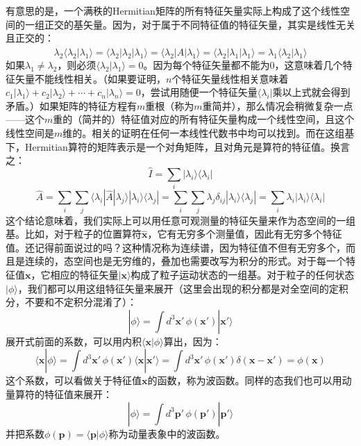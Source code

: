 \documentclass{ctexart}
\begin{document}
有意思的是，一个满秩的Hermitian矩阵的所有特征矢量实际上构成了这个线性空间的一组正交的基矢量。因为，对于属于不同特征值的特征矢量，其实是线性无关且正交的：
\begin{equation}
\lambda_2\langle\lambda_2|\lambda_1\rangle=\langle\lambda_2|\lambda_2|\lambda_1\rangle=\langle\lambda_2|\hat{A}|\lambda_1\rangle=\langle\lambda_2|\lambda_1|\lambda_1\rangle=\lambda_1\langle\lambda_2|\lambda_1\rangle
\end{equation}
如果$\lambda_1\neq\lambda_2$，则必须$\langle\lambda_2|\lambda_1\rangle=0$。因为每个特征矢量都不能为0，这意味着几个特征矢量不能线性相关。（如果要证明，$n$个特征矢量线性相关意味着$c_1|\lambda_1\rangle+c_2|\lambda_2\rangle+\cdots+c_n|\lambda_n\rangle=0$，尝试用随便一个特征矢量$\langle\lambda_i|$乘以上式就会得到矛盾。）如果矩阵的特征方程有$m$重根（称为$m$重简并），那么情况会稍微复杂一点——这个$m$重的（简并的）特征值对应的所有特征矢量构成一个线性空间，且这个线性空间是$m$维的。相关的证明在任何一本线性代数书中均可以找到。而在这组基下，Hermitian算符的矩阵表示是一个对角矩阵，且对角元是算符的特征值。换言之：
\begin{equation}
\hat{I}=\sum_i|\lambda_i\rangle\langle\lambda_i|
\end{equation}
\begin{equation}
\hat{A}=\sum_i\sum_j\langle \lambda_i|\hat{A}|\lambda_j\rangle|\lambda_i\rangle\langle \lambda_j|=\sum_i\sum_j\lambda_j\delta_{ij}|\lambda_i\rangle\langle \lambda_j|=\sum_i\lambda_i|\lambda_i\rangle\langle \lambda_i|
\end{equation}
这个结论意味着，我们实际上可以用任意可观测量的特征矢量来作为态空间的一组基。比如，对于粒子的位置算符$\hat{\bm{x}}$，它有无穷多个测量值，因此有无穷多个特征值。还记得前面说过的吗？这种情况称为连续谱，因为特征值不但有无穷多个，而且是连续的，态空间也是无穷维的，叠加也需要改写为积分的形式。对于每一个特征值$\bm{x}$，它相应的特征矢量$|\bm{x}\rangle$构成了粒子运动状态的一组基。对于粒子的任何状态$|\phi\rangle$，我们都可以用这组特征矢量来展开（这里会出现的积分都是对全空间的定积分，不要和不定积分混淆了）：
\begin{equation}
|\phi\rangle=\int d^3\bm{x'}\, \phi(\bm{x'})|\bm{x'}\rangle
\end{equation}
展开式前面的系数，可以用内积$\langle\bm{x}|\phi\rangle$算出，因为：
\begin{equation}
\langle\bm{x}|\phi\rangle=\int d^3\bm{x'}\, \phi(\bm{x'})\langle\bm{x}|\bm{x'}\rangle=\int d^3\bm{x'}\, \phi(\bm{x'})\delta(\bm{x}-\bm{x'})=\phi(\bm{x})
\end{equation}
这个系数，可以看做关于特征值$\bm{x}$的函数，称为波函数。同样的态我们也可以用动量算符的特征值来展开：
\begin{equation}
|\phi\rangle=\int d^3\bm{p'}\, \phi(\bm{p'})|\bm{p'}\rangle
\end{equation}
并把系数$\phi(\bm{p})=\langle\bm{p}|\phi\rangle$称为动量表象中的波函数。
\end{document}
